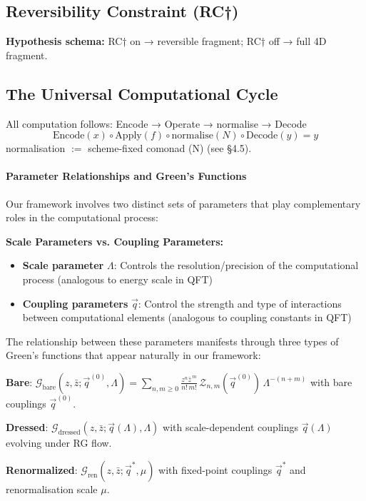 \subsection{Reversibility Constraint (RC†)}

\begin{definition}
\label{def:reversibility-constraint}
\textbf{Hypothesis schema:} RC† on → reversible fragment; RC† off → full 4D fragment.
\end{definition}

\subsection{The Universal Computational Cycle}

All computation follows: Encode → Operate → normalise → Decode
\[
\text{Encode}(x) \circ \text{Apply}(f) \circ \text{normalise}(N) \circ \text{Decode}(y) = y
\]
normalisation $:=$ scheme-fixed comonad (N) (see §4.5).

\paragraph{Parameter Relationships and Green's Functions}
Our framework involves two distinct sets of parameters that play complementary roles in the computational process:

\textbf{Scale Parameters vs. Coupling Parameters:}
\begin{itemize}
\item \textbf{Scale parameter} $\Lambda$: Controls the resolution/precision of the computational process (analogous to energy scale in QFT)
\item \textbf{Coupling parameters} $\vec{q}$: Control the strength and type of interactions between computational elements (analogous to coupling constants in QFT)
\end{itemize}

The relationship between these parameters manifests through three types of Green's functions that appear naturally in our framework:

\begin{definition}
\label{def:greens-functions-hierarchy}
\textbf{Bare}: $\mathcal{G}_{\text{bare}}(z,\bar{z};\vec{q}^{(0)},\Lambda) = \sum_{n,m\ge0}\frac{z^n\bar{z}^{\,m}}{n!\,m!}\,\mathcal{Z}_{n,m}(\vec{q}^{(0)})\,\Lambda^{-(n+m)}$ with bare couplings $\vec{q}^{(0)}$.

\textbf{Dressed}: $\mathcal{G}_{\text{dressed}}(z,\bar{z};\vec{q}(\Lambda),\Lambda)$ with scale-dependent couplings $\vec{q}(\Lambda)$ evolving under RG flow.

\textbf{Renormalized}: $\mathcal{G}_{\text{ren}}(z,\bar{z};\vec{q}^*,\mu)$ with fixed-point couplings $\vec{q}^*$ and renormalisation scale $\mu$.
\end{definition}

